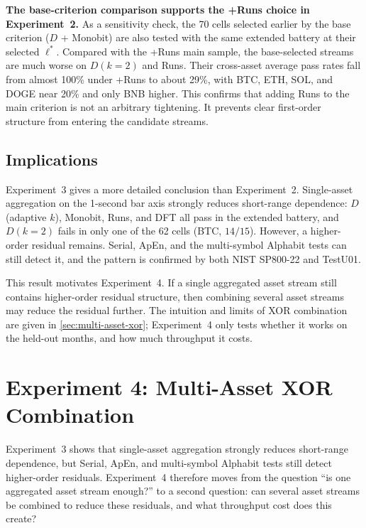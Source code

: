 \documentclass[11pt,titlepage,openany,oneside]{book}  %
\begin{document}
\textbf{The base-criterion comparison supports the +Runs choice in Experiment~2.} As a sensitivity check, the 70 cells selected earlier by the base criterion ($D$ + Monobit) are also tested with the same extended battery at their selected $\ell^*$. Compared with the +Runs main sample, the base-selected streams are much worse on $D(k=2)$ and Runs. Their cross-asset average pass rates fall from almost 100\% under +Runs to about 29\%, with BTC, ETH, SOL, and DOGE near 20\% and only BNB higher. This confirms that adding Runs to the main criterion is not an arbitrary tightening. It prevents clear first-order structure from entering the candidate streams.

\FloatBarrier

\subsection{Implications}
\label{sec:exp3-implications}

Experiment~3 gives a more detailed conclusion than Experiment~2. Single-asset aggregation on the 1-second bar axis strongly reduces short-range dependence: $D$ (adaptive $k$), Monobit, Runs, and DFT all pass in the extended battery, and $D(k=2)$ fails in only one of the 62 cells (BTC, $14/15$). However, a higher-order residual remains. Serial, ApEn, and the multi-symbol Alphabit tests can still detect it, and the pattern is confirmed by both NIST SP800-22 and TestU01.

This result motivates Experiment~4. If a single aggregated asset stream still contains higher-order residual structure, then combining several asset streams may reduce the residual further. The intuition and limits of XOR combination are given in \cref{sec:multi-asset-xor}; Experiment~4 only tests whether it works on the held-out months, and how much throughput it costs.

\section{Experiment 4: Multi-Asset XOR Combination}
\label{sec:exp4}

Experiment~3 shows that single-asset aggregation strongly reduces short-range dependence, but Serial, ApEn, and multi-symbol Alphabit tests still detect higher-order residuals. Experiment~4 therefore moves from the question ``is one aggregated asset stream enough?'' to a second question: can several asset streams be combined to reduce these residuals, and what throughput cost does this create?
\end{document}
